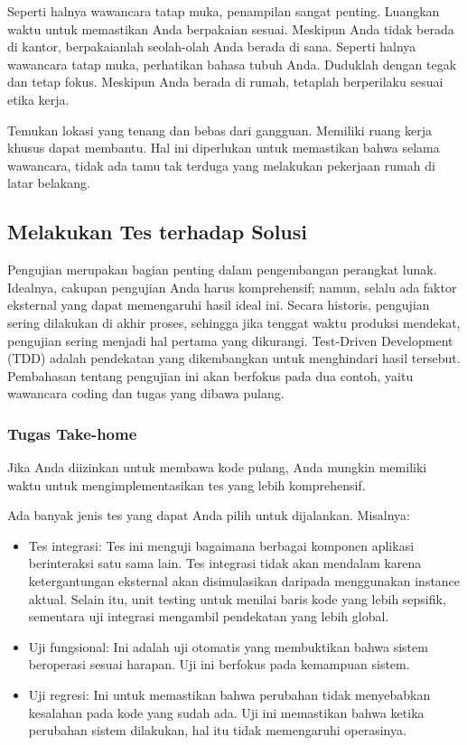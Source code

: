\documentclass{article}
\begin{document}
Seperti halnya wawancara tatap muka, penampilan sangat penting. Luangkan waktu untuk memastikan Anda berpakaian sesuai. Meskipun Anda tidak berada di kantor, berpakaianlah seolah-olah Anda berada di sana. Seperti halnya wawancara tatap muka, perhatikan bahasa tubuh Anda. Duduklah dengan tegak dan tetap fokus. Meskipun Anda berada di rumah, tetaplah berperilaku sesuai etika kerja.

Temukan lokasi yang tenang dan bebas dari gangguan. Memiliki ruang kerja khusus dapat membantu. Hal ini diperlukan untuk memastikan bahwa selama wawancara, tidak ada tamu tak terduga yang melakukan pekerjaan rumah di latar belakang.

\subsection{Melakukan Tes terhadap Solusi}
Pengujian merupakan bagian penting dalam pengembangan perangkat lunak. Idealnya, cakupan pengujian Anda harus komprehensif; namun, selalu ada faktor eksternal yang dapat memengaruhi hasil ideal ini. Secara historis, pengujian sering dilakukan di akhir proses, sehingga jika tenggat waktu produksi mendekat, pengujian sering menjadi hal pertama yang dikurangi. Test-Driven Development (TDD) adalah pendekatan yang dikembangkan untuk menghindari hasil tersebut. Pembahasan tentang pengujian ini akan berfokus pada dua contoh, yaitu wawancara coding dan tugas yang dibawa pulang.

\subsubsection{Tugas Take-home}
Jika Anda diizinkan untuk membawa kode pulang, Anda mungkin memiliki waktu untuk mengimplementasikan tes yang lebih komprehensif.

Ada banyak jenis tes yang dapat Anda pilih untuk dijalankan. Misalnya:
\begin{itemize}
    \item Tes integrasi: Tes ini menguji bagaimana berbagai komponen aplikasi berinteraksi satu sama lain. Tes integrasi tidak akan mendalam karena ketergantungan eksternal akan disimulasikan daripada menggunakan instance aktual. Selain itu, unit testing untuk menilai baris kode yang lebih sepsifik, sementara uji integrasi mengambil pendekatan yang lebih global.
    \item Uji fungsional: Ini adalah uji otomatis yang membuktikan bahwa sistem beroperasi sesuai harapan. Uji ini berfokus pada kemampuan sistem.
    \item Uji regresi: Ini untuk memastikan bahwa perubahan tidak menyebabkan kesalahan pada kode yang sudah ada. Uji ini memastikan bahwa ketika perubahan sistem dilakukan, hal itu tidak memengaruhi operasinya.
\end{itemize}
\end{document}
